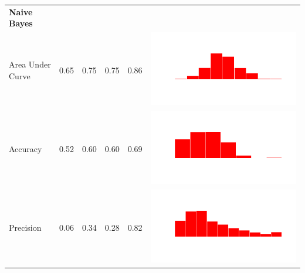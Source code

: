 \begin{table}
\begin{tabular}{lrrrrc}
    \bf{Naive Bayes}\\
    Area Under Curve & 0.65 & 0.75 & 0.75 & 0.86 & \includegraphics[scale = 0.1, clip = true, trim= 50px 60px 50px 60px]{../figs/hist-results/hist-NBauc.pdf} \\
    Accuracy & 0.52 & 0.60 & 0.60 & 0.69 & \includegraphics[scale = 0.1, clip = true, trim= 50px 60px 50px 60px]{../figs/hist-results/hist-NBacc.pdf} \\
    Precision & 0.06 & 0.34 & 0.28 & 0.82 & \includegraphics[scale = 0.1, clip = true, trim= 50px 60px 50px 60px]{../figs/hist-results/hist-NBprec.pdf} \\

\end{tabular}
\end{table}

